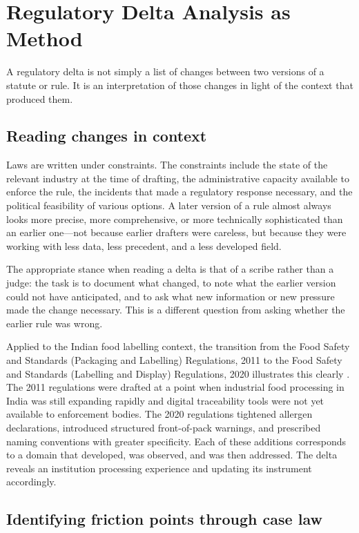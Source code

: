 \documentclass[12pt,a4paper]{article}
\begin{document}
\section{Regulatory Delta Analysis as Method}

A regulatory delta is not simply a list of changes between two versions of a
statute or rule. It is an interpretation of those changes in light of the context
that produced them.

\subsection{Reading changes in context}

Laws are written under constraints. The constraints include the state of the
relevant industry at the time of drafting, the administrative capacity available to
enforce the rule, the incidents that made a regulatory response necessary, and the
political feasibility of various options. A later version of a rule almost always
looks more precise, more comprehensive, or more technically sophisticated than an
earlier one---not because earlier drafters were careless, but because they were
working with less data, less precedent, and a less developed field.

The appropriate stance when reading a delta is that of a scribe rather than a
judge: the task is to document what changed, to note what the earlier version could
not have anticipated, and to ask what new information or new pressure made the
change necessary. This is a different question from asking whether the earlier rule
was wrong.

Applied to the Indian food labelling context, the transition from the Food Safety
and Standards (Packaging and Labelling) Regulations, 2011 to the Food Safety and
Standards (Labelling and Display) Regulations, 2020 illustrates this clearly
\cite{ifid:regs2026}. The 2011 regulations were drafted at a point when
industrial food processing in India was still expanding rapidly and digital
traceability tools were not yet available to enforcement bodies. The 2020
regulations tightened allergen declarations, introduced structured front-of-pack
warnings, and prescribed naming conventions with greater specificity. Each of these
additions corresponds to a domain that developed, was observed, and was then
addressed. The delta reveals an institution processing experience and updating its
instrument accordingly.

\subsection{Identifying friction points through case law}
\end{document}
